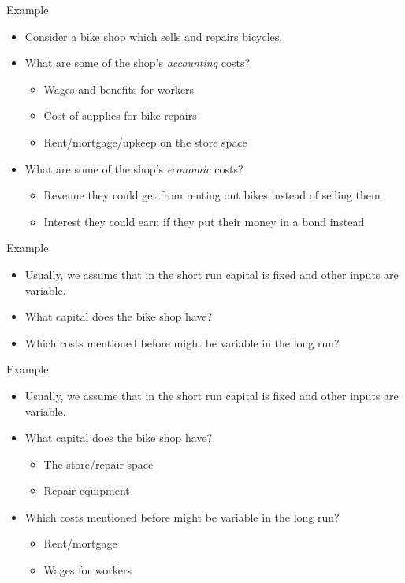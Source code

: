 \documentclass[aspectratio=169]{beamer}
\begin{document}
\begin{frame}{Example}
    \begin{itemize}
        \item Consider a bike shop which sells and repairs bicycles.
        \item What are some of the shop's \textit{accounting} costs?
            \begin{itemize}
                \item Wages and benefits for workers
                \item Cost of supplies for bike repairs
                \item Rent/mortgage/upkeep on the store space
            \end{itemize}
        \item What are some of the shop's \textit{economic} costs?
            \begin{itemize}
                \item Revenue they could get from renting out bikes instead of selling them
                \item Interest they could earn if they put their money in a bond instead
            \end{itemize}
    \end{itemize}
\end{frame}

\begin{frame}{Example}
    \begin{itemize}
        \item Usually, we assume that in the short run capital is fixed and other inputs are variable.
        \item What capital does the bike shop have?
        \item Which costs mentioned before might be variable in the long run?
    \end{itemize}
\end{frame}

\begin{frame}{Example}
    \begin{itemize}
        \item Usually, we assume that in the short run capital is fixed and other inputs are variable.
        \item What capital does the bike shop have?
            \begin{itemize}
                \item The store/repair space
                \item Repair equipment
            \end{itemize}
        \item Which costs mentioned before might be variable in the long run?
            \begin{itemize}
                \item Rent/mortgage
                \item Wages for workers
            \end{itemize}
    \end{itemize}
\end{frame}
\end{document}
